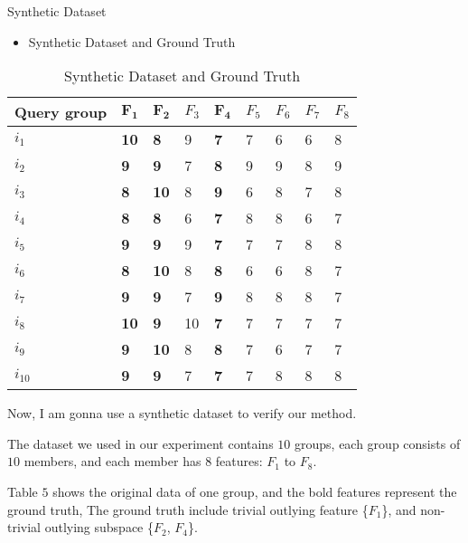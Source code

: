 \documentclass[
size=14pt,
paper=smartboard,  %
mode=present, 		%
display=slides, 	%
style=tuliplab,  	%
pauseslide,
fleqn,leqno]{powerdot}
\begin{document}
\begin{slide}{Synthetic Dataset}
	
	\begin{itemize}
		\item Synthetic Dataset and Ground Truth
	\end{itemize}
	
	\begin{table}
		\setlength{\abovecaptionskip}{0pt}
		\setlength{\belowcaptionskip}{10pt}
		\centering
		\caption{Synthetic Dataset and Ground Truth}
		
		\begin{tabular}{p{2.8cm}p{0.9cm}p{0.9cm}p{0.9cm}p{0.9cm}p{0.9cm}p{0.9cm}p{0.9cm}p{0.9cm}}
			\hline
			Query group  & $\mathbf{F_1}$ & $\mathbf{F_2}$ & $F_3$ & $\mathbf{F_4}$ & $F_5$ & $F_6$ & $F_7$ & $F_8$\\
			\hline
			$i_1$   & \bf{10} & \bf{8}  & 9  & \bf{7}  & 7 & 6 & 6  & 8\\
			$i_2$   & \bf{9}  & \bf{9}  & 7  & \bf{8}  & 9 & 9 & 8  & 9\\
			$i_3$   & \bf{8}  & \bf{10} & 8  & \bf{9}  & 6 & 8 & 7  & 8\\
			$i_4$   & \bf{8}  & \bf{8}  & 6  & \bf{7}  & 8 & 8 & 6  & 7\\
			$i_5$   & \bf{9}  & \bf{9}  & 9  & \bf{7}  & 7 & 7 & 8  & 8\\
			$i_6$   & \bf{8}  & \bf{10} & 8  & \bf{8}  & 6 & 6 & 8  & 7\\
			$i_7$   & \bf{9}  & \bf{9}  & 7  & \bf{9}  & 8 & 8 & 8  & 7\\
			$i_8$   & \bf{10} & \bf{9}  & 10 & \bf{7}  & 7 & 7 & 7  & 7\\
			$i_9$   & \bf{9}  & \bf{10} & 8  & \bf{8}  & 7 & 6 & 7  & 7\\
			$i_{10}$& \bf{9}  & \bf{9}  & 7  & \bf{7}  & 7 & 8 & 8  & 8\\
			\hline
		\end{tabular}
	\end{table}
	
	\begin{note}
		Now,
		I am gonna use a synthetic dataset to verify our method.
		
		The dataset we used in our experiment contains $10$ groups,
		each group consists of $10$ members,
		and each member has $8$ features: $F_1$ to $F_8$.
		
		Table $5$ shows the original data of one group,
		and the bold features represent the ground truth,
		The ground truth include trivial outlying feature \{$F_1$\},
		and non-trivial outlying subspace \{$F_2$, $F_4$\}.
	\end{note}
	
\end{slide}
\end{document}
